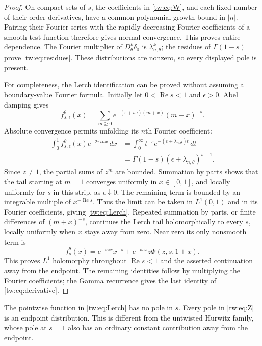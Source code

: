\begin{proof}
On compact sets of $s$, the coefficients in \eqref{tw:eq:W}, and each
fixed number of their order derivatives, have a common polynomial
growth bound in $|n|$. Pairing their Fourier series with the rapidly
decreasing Fourier coefficients of a smooth test function therefore
gives normal convergence. This proves entire dependence. The Fourier
multiplier of $D_\theta^k\delta_0$ is $\lambda_{n,\theta}^k$;
the residues of $\Gamma(1-s)$ prove \eqref{tw:eq:residues}. These
distributions are nonzero, so every displayed pole is present.

For completeness, the Lerch identification can be proved without
assuming a boundary-value Fourier formula. Initially let
$0<\operatorname{Re}s<1$ and $\epsilon>0$. Abel damping gives
\[
 f_{s,\epsilon}^\theta(x)
 =\sum_{m\ge0}e^{-(\epsilon+i\omega)(m+x)}(m+x)^{-s}.
\]
Absolute convergence permits unfolding its $n$th Fourier coefficient:
\begin{align*}
 \int_0^1 f_{s,\epsilon}^\theta(x)e^{-2\pi i n x}\,dx
 &=\int_0^\infty t^{-s}e^{-(\epsilon+\lambda_{n,\theta})t}\,dt\\
 &=\Gamma(1-s)(\epsilon+\lambda_{n,\theta})^{s-1}.
\end{align*}
Since $z\ne1$, the partial sums of $z^m$ are bounded. Summation by
parts shows that the tail starting at $m=1$ converges uniformly in
$x\in[0,1]$, and locally uniformly for $s$ in this strip, as
$\epsilon\downarrow0$. The remaining term is bounded by an integrable
multiple of $x^{-\operatorname{Re}s}$. Thus the limit can be taken in
$L^1(0,1)$ and in its Fourier coefficients, giving
\eqref{tw:eq:Lerch}. Repeated summation by parts, or finite differences
of $(m+x)^{-s}$, continues the Lerch tail holomorphically to every
$s$, locally uniformly when $x$ stays away from zero. Near zero its
only nonsmooth term is
\begin{equation}\label{tw:eq:localLerch}
 f_s^\theta(x)=e^{-i\omega x}x^{-s}
                +e^{-i\omega x}z\Phi(z,s,1+x).
\end{equation}
This proves $L^1$ holomorphy throughout $\operatorname{Re}s<1$ and
the asserted continuation away from the endpoint. The remaining
identities follow by multiplying the Fourier coefficients; the
Gamma recurrence gives the last identity of
\eqref{tw:eq:derivative}.
\end{proof}

The pointwise function in \eqref{tw:eq:Lerch} has no pole in $s$.
Every pole in \eqref{tw:eq:Z} is an endpoint distribution. This is
different from the untwisted Hurwitz family, whose pole at $s=1$
also has an ordinary constant contribution away from the endpoint.


